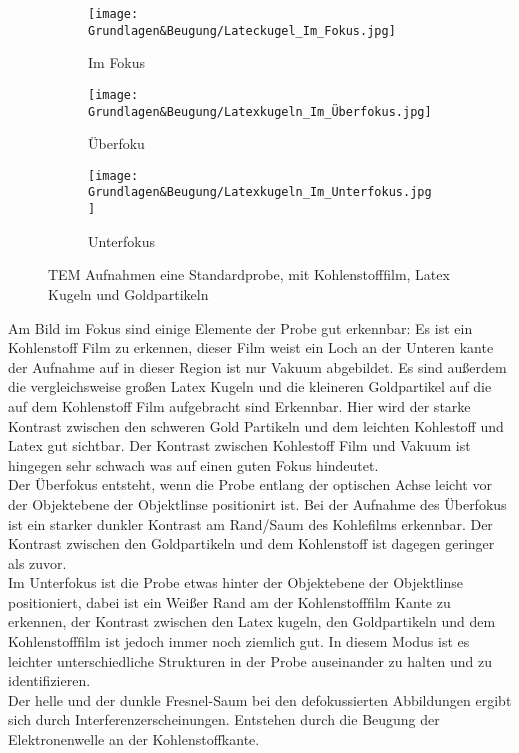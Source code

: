 \begin{figure}
     \centering
     \begin{subfigure}[b]{0.3\textwidth}
         \centering
         \texttt{[image: Grundlagen\&Beugung/Lateckugel\_Im\_Fokus.jpg]}
         \caption{Im Fokus}
         \label{SPFokus}
     \end{subfigure}
     \hfill
     \begin{subfigure}[b]{0.3\textwidth}
         \centering
         \texttt{[image: Grundlagen\&Beugung/Latexkugeln\_Im\_Überfokus.jpg]}
         \caption{Überfoku}
         \label{SPÜberfoku}
     \end{subfigure}
     \hfill
     \begin{subfigure}[b]{0.3\textwidth}
         \centering
         \texttt{[image: Grundlagen\&Beugung/Latexkugeln\_Im\_Unterfokus.jpg]}
         \caption{Unterfokus}
         \label{SPUnterfokus}
     \end{subfigure}
        \caption{TEM Aufnahmen eine Standardprobe, mit Kohlenstofffilm, Latex Kugeln und Goldpartikeln}
        \label{TEMStandardprobe}
\end{figure}

Am Bild im Fokus sind einige Elemente der Probe gut erkennbar: Es ist ein Kohlenstoff Film zu erkennen, dieser Film weist ein Loch an der Unteren kante der Aufnahme auf in dieser Region ist nur Vakuum abgebildet. Es sind außerdem die vergleichsweise großen Latex Kugeln und die kleineren Goldpartikel auf die auf dem Kohlenstoff Film aufgebracht sind Erkennbar. Hier wird der starke Kontrast zwischen den schweren Gold Partikeln und dem leichten Kohlestoff und Latex gut sichtbar. Der Kontrast zwischen Kohlestoff Film und Vakuum ist hingegen sehr schwach was auf einen guten Fokus hindeutet.\\
Der Überfokus entsteht, wenn die Probe entlang der optischen Achse leicht vor der Objektebene der Objektlinse positionirt ist. Bei der Aufnahme des Überfokus ist ein starker dunkler Kontrast am Rand/Saum des Kohlefilms erkennbar. Der Kontrast zwischen den Goldpartikeln und dem Kohlenstoff ist dagegen geringer als zuvor. \\
Im Unterfokus ist die Probe etwas hinter der Objektebene der Objektlinse positioniert, dabei ist ein Weißer Rand am der Kohlenstofffilm Kante zu erkennen, der Kontrast zwischen den Latex kugeln, den Goldpartikeln und dem Kohlenstofffilm ist jedoch immer noch ziemlich gut. In diesem Modus ist es leichter unterschiedliche Strukturen in der Probe auseinander zu halten und zu identifizieren.\\
Der helle und der dunkle Fresnel-Saum bei den defokussierten Abbildungen ergibt sich durch Interferenzerscheinungen. Entstehen durch die Beugung der Elektronenwelle an der Kohlenstoffkante.

